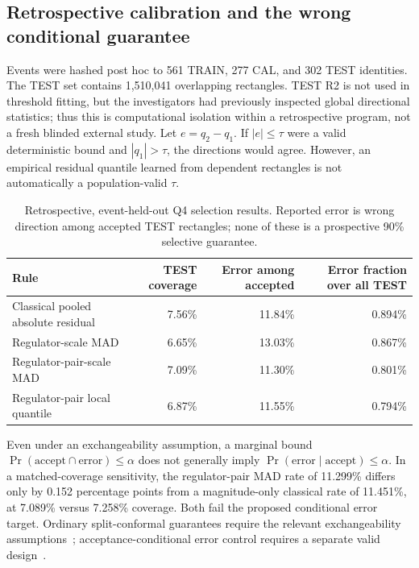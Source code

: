 \subsection{Retrospective calibration and the wrong conditional guarantee}
Events were hashed post hoc to 561 TRAIN, 277 CAL, and 302 TEST identities. The TEST set contains 1,510,041 overlapping rectangles. TEST R2 is not used in threshold fitting, but the investigators had previously inspected global directional statistics; thus this is computational isolation within a retrospective program, not a fresh blinded external study. Let $e=q_2-q_1$. If $|e|\le\tau$ were a valid deterministic bound and $|q_1|>\tau$, the directions would agree. However, an empirical residual quantile learned from dependent rectangles is not automatically a population-valid $\tau$.
\begin{table}[htbp]
\centering\small
\caption{Retrospective, event-held-out Q4 selection results. Reported error is wrong direction among accepted TEST rectangles; none of these is a prospective 90\% selective guarantee.}
\label{tab:q4-selection}
\begin{tabularx}{\textwidth}{@{}Xrrr@{}}
\toprule Rule & TEST coverage & Error among accepted & Error fraction over all TEST\\\midrule
Classical pooled absolute residual & 7.56\% & 11.84\% & 0.894\%\\
Regulator-scale MAD & 6.65\% & 13.03\% & 0.867\%\\
Regulator-pair-scale MAD & 7.09\% & 11.30\% & 0.801\%\\
Regulator-pair local quantile & 6.87\% & 11.55\% & 0.794\%\\\bottomrule
\end{tabularx}
\end{table}
Even under an exchangeability assumption, a marginal bound $\Pr(\mathrm{accept}\cap\mathrm{error})\le\alpha$ does not generally imply $\Pr(\mathrm{error}\mid\mathrm{accept})\le\alpha$. In a matched-coverage sensitivity, the regulator-pair MAD rate of 11.299\% differs only by 0.152 percentage points from a magnitude-only classical rate of 11.451\%, at 7.089\% versus 7.258\% coverage. Both fail the proposed conditional error target. Ordinary split-conformal guarantees require the relevant exchangeability assumptions~\cite{lei2018distribution}; acceptance-conditional error control requires a separate valid design~\cite{geifman2017selective,angelopoulos2024conformalrisk}.

